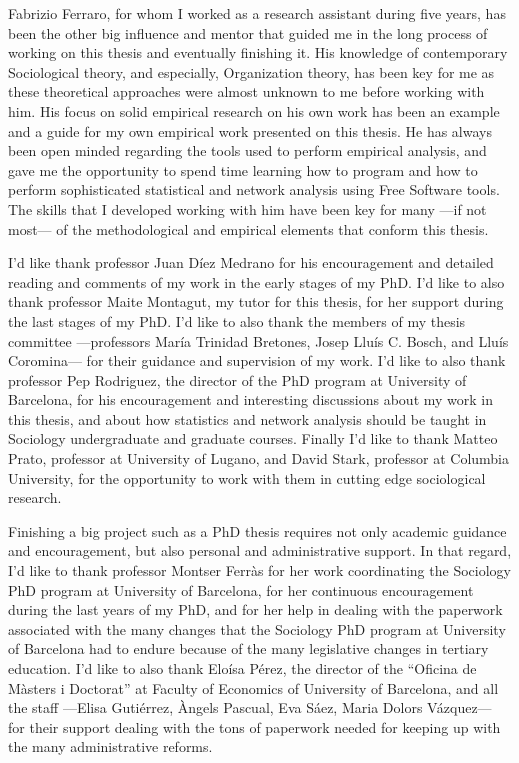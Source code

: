 Fabrizio Ferraro, for whom I worked as a research assistant during five years, has been the other big influence and mentor that guided me in the long process of working on this thesis and eventually finishing it. His knowledge of contemporary Sociological theory, and especially, Organization theory, has been key for me as these theoretical approaches were almost unknown to me before working with him. His focus on solid empirical research on his own work has been an example and a guide for my own empirical work presented on this thesis. He has always been open minded regarding the tools used to perform empirical analysis, and gave me the opportunity to spend time learning how to program and how to perform sophisticated statistical and network analysis using Free Software tools. The skills that I developed working with him have been key for many ---if not most--- of the methodological and empirical elements that conform this thesis.

I'd like thank professor Juan Díez Medrano for his encouragement and detailed reading and comments of my work in the early stages of my PhD. I'd like to also thank professor Maite Montagut, my tutor for this thesis, for her support during the last stages of my PhD. I'd like to also thank the members of my thesis committee ---professors María Trinidad Bretones, Josep Lluís C. Bosch, and Lluís Coromina--- for their guidance and supervision of my work. I'd like to also thank professor Pep Rodriguez, the director of the PhD program at University of Barcelona, for his encouragement and interesting discussions about my work in this thesis, and about how statistics and network analysis should be taught in Sociology undergraduate and graduate courses. Finally I'd like to thank Matteo Prato, professor at University of Lugano, and David Stark, professor at Columbia University, for the opportunity to work with them in cutting edge sociological research.

Finishing a big project such as a PhD thesis requires not only academic guidance and encouragement, but also personal and administrative support. In that regard, I'd like to thank professor Montser Ferràs for her work coordinating the Sociology PhD program at University of Barcelona, for her continuous encouragement during the last years of my PhD, and for her help in dealing with the paperwork associated with the many changes that the Sociology PhD program at University of Barcelona had to endure because of the many legislative changes in tertiary education. I'd like to also thank Eloísa Pérez, the director of the ``Oficina de Màsters i Doctorat'' at Faculty of Economics of University of Barcelona, and all the staff ---Elisa Gutiérrez, Àngels Pascual, Eva Sáez, Maria Dolors Vázquez--- for their support dealing with the tons of paperwork needed for keeping up with the many administrative reforms.


